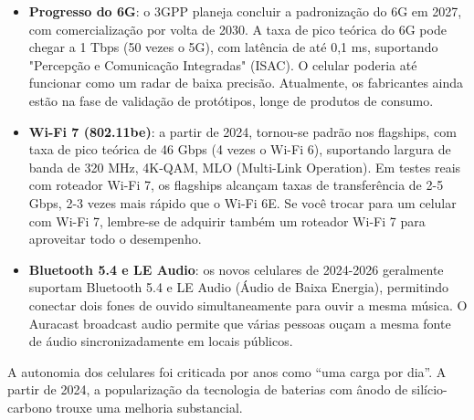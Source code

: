 \begin{itemize}
  \item \textbf{Progresso do 6G}: o 3GPP planeja concluir a padronização do 6G em 2027, com comercialização por volta de 2030. A taxa de pico teórica do 6G pode chegar a 1 Tbps (50 vezes o 5G), com latência de até 0,1 ms, suportando "Percepção e Comunicação Integradas" (ISAC). O celular poderia até funcionar como um radar de baixa precisão. Atualmente, os fabricantes ainda estão na fase de validação de protótipos, longe de produtos de consumo.
  \item \textbf{Wi-Fi 7 (802.11be)}: a partir de 2024, tornou-se padrão nos flagships, com taxa de pico teórica de 46 Gbps (4 vezes o Wi-Fi 6), suportando largura de banda de 320 MHz, 4K-QAM, MLO (Multi-Link Operation). Em testes reais com roteador Wi-Fi 7, os flagships alcançam taxas de transferência de 2-5 Gbps, 2-3 vezes mais rápido que o Wi-Fi 6E. Se você trocar para um celular com Wi-Fi 7, lembre-se de adquirir também um roteador Wi-Fi 7 para aproveitar todo o desempenho.
  \item \textbf{Bluetooth 5.4 e LE Audio}: os novos celulares de 2024-2026 geralmente suportam Bluetooth 5.4 e LE Audio (Áudio de Baixa Energia), permitindo conectar dois fones de ouvido simultaneamente para ouvir a mesma música. O Auracast broadcast audio permite que várias pessoas ouçam a mesma fonte de áudio sincronizadamente em locais públicos.
\end{itemize}


A autonomia dos celulares foi criticada por anos como “uma carga por dia”. A partir de 2024, a popularização da tecnologia de baterias com ânodo de silício-carbono trouxe uma melhoria substancial.

